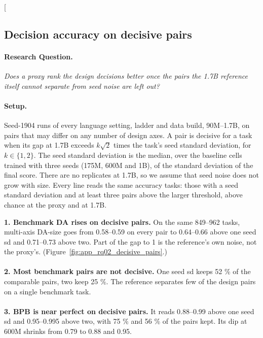 \clearpage
\twocolumn[{%
\subsection{Decision accuracy on decisive pairs}
\label{app:rq02_decisive_pairs}

\noindent\begin{minipage}[t]{0.485\textwidth}
\vspace{0pt}
\paragraph{Research Question.} \emph{Does a proxy rank the design decisions better once the pairs the 1.7B reference itself cannot separate from seed noise are left out?}

\paragraph{Setup.} Seed-1904 runs of every language setting, ladder and data build, 90M--1.7B, on pairs that may differ on any number of design axes. A pair is decisive for a task when its gap at 1.7B exceeds $k \sqrt{2}$ times the task's seed standard deviation, for $k \in \{1, 2\}$. The seed standard deviation is the median, over the baseline cells trained with three seeds (175M, 600M and 1B), of the standard deviation of the final score. There are no replicates at 1.7B, so we assume that seed noise does not grow with size. Every line reads the same accuracy tasks: those with a seed standard deviation and at least three pairs above the larger threshold, above chance at the proxy and at 1.7B.
\end{minipage}\hfill
\begin{minipage}[t]{0.485\textwidth}
\vspace{0pt}
\begin{rqfinding}
\textbf{1. Benchmark DA rises on decisive pairs.} On the same 849--962 tasks, multi-axis DA-size goes from 0.58--0.59 on every pair to 0.64--0.66 above one seed sd and 0.71--0.73 above two. Part of the gap to 1 is the reference's own noise, not the proxy's. (Figure~\ref{fig:app_rq02_decisive_pairs}.)
\\
\\
\textbf{2. Most benchmark pairs are not decisive.} One seed sd keeps 52 \% of the comparable pairs, two keep 25 \%. The reference separates few of the design pairs on a single benchmark task.
\\
\\
\textbf{3. BPB is near perfect on decisive pairs.} It reads 0.88--0.99 above one seed sd and 0.95--0.995 above two, with 75 \% and 56 \% of the pairs kept. Its dip at 600M shrinks from 0.79 to 0.88 and 0.95.
\end{rqfinding}
\end{minipage}

}
